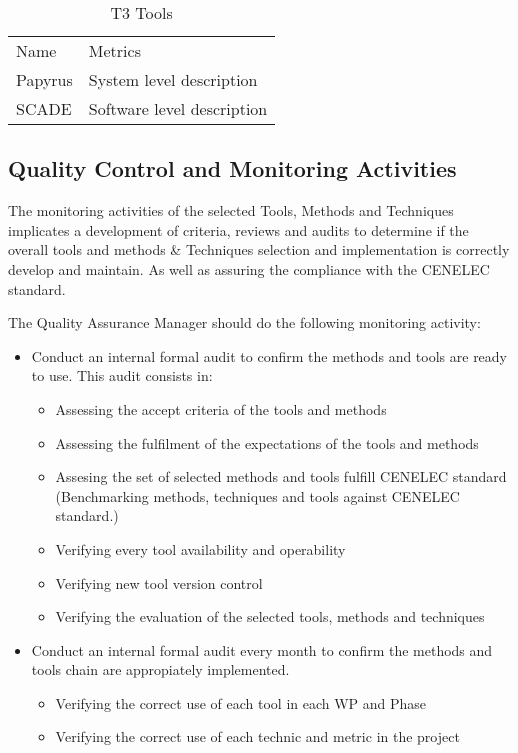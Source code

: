 \documentclass{template/openetcs_article}
\begin{document}
\begin{table}[H]
\begin{tabular}{|m{3cm}|m{10cm}|}
\hline
\rowcolor{myblue}
\multicolumn{2}{|c|}{T3 Tools} \\\hline
\rowcolor{lightgray}
Name &
Metrics 
\\\hline
Papyrus & System level description\\\hline
SCADE & Software level description\\\hline

\end{tabular}
\caption{T3 Tools}
\end{table}

\subsection{Quality Control and Monitoring Activities}
The monitoring activities of the selected Tools, Methods and Techniques implicates a development of criteria, reviews and audits to determine if the overall tools and methods \& Techniques selection and implementation is correctly develop and maintain. As well as assuring the compliance with the CENELEC standard.

The Quality Assurance Manager should do the following monitoring activity:
\begin{itemize}
\item Conduct an internal formal audit to confirm the methods and tools are ready to use. This audit consists in:
\begin{itemize}
\item Assessing the accept criteria of the tools and methods
\item Assessing the fulfilment of the expectations of the tools and methods
\item Assesing the set of selected methods and tools fulfill CENELEC standard (Benchmarking methods, techniques and tools against CENELEC standard.)
\item Verifying every tool availability and operability
\item Verifying new tool version control
\item Verifying the evaluation of the selected tools, methods and techniques
\end{itemize}
\item Conduct an internal formal audit every month to confirm the methods and tools chain are appropiately implemented. 
\begin{itemize}
\item Verifying the correct use of each tool in each WP and Phase
\item Verifying the correct use of each technic and metric in the project
\end{itemize}
\end{itemize}
\end{document}
